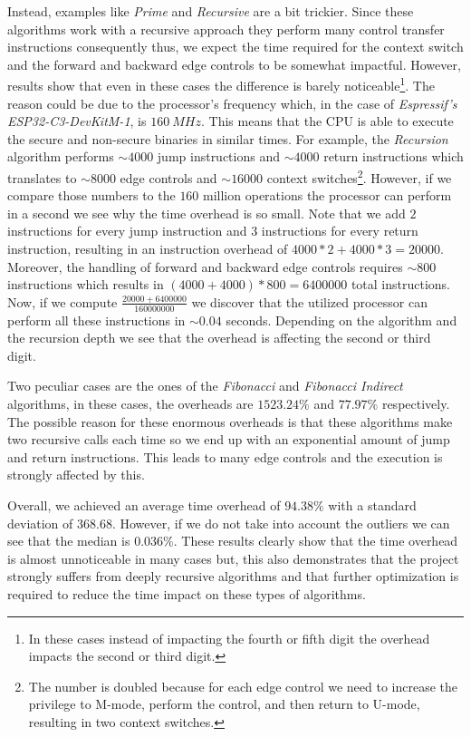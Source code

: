 Instead, examples like \textit{Prime} and \textit{Recursive} are a bit trickier.
Since these algorithms work with a recursive approach they perform many control
transfer instructions consequently thus, we expect the time required for the context
switch and the forward and backward edge controls to be somewhat impactful.
However, results show that even in these cases the difference is barely noticeable\footnote{In
these cases instead of impacting the fourth or fifth digit the overhead impacts
the second or third digit.}. The reason could be due to the processor's frequency
which, in the case of \textit{Espressif's ESP32-C3-DevKitM-1}, is $160 \ MHz$. This
means that the CPU is able to execute the secure and non-secure binaries in similar
times. For example, the \textit{Recursion} algorithm performs $\sim 4000$ jump
instructions and $\sim 4000$ return instructions which translates to $\sim 8000$
edge controls and $\sim 16000$ context switches\footnote{The number is doubled
because for each edge control we need to increase the privilege to M-mode, perform
the control, and then return to U-mode, resulting in two context switches.}.
However, if we compare those numbers to the $160$ million operations the processor
can perform in a second we see why the time overhead is so small. Note that we
add $2$ instructions for every jump instruction and $3$ instructions for every
return instruction, resulting in an instruction overhead of $4000*2 + 4000*3 = 20
000$. Moreover, the handling of forward and backward edge controls requires $\sim
800$ instructions which results in $(4000 + 4000) * 800 = 6400000$ total instructions.
Now, if we compute $\frac{20000 + 6400000}{160000000}$ we discover that the utilized
processor can perform all these instructions in $\sim 0.04$ seconds. Depending
on the algorithm and the recursion depth we see that the overhead is affecting
the second or third digit.

Two peculiar cases are the ones of the \textit{Fibonacci} and \textit{Fibonacci
Indirect} algorithms, in these cases, the overheads are $1523.24\%$ and
$77.97\%$ respectively. The possible reason for these enormous overheads is that
these algorithms make two recursive calls each time so we end up with an exponential
amount of jump and return instructions. This leads to many edge controls and the
execution is strongly affected by this.

Overall, we achieved an average time overhead of $94.38\%$ with a standard deviation
of $368.68$. However, if we do not take into account the outliers we can see that
the median is $0.036\%$. These results clearly show that the time overhead is
almost unnoticeable in many cases but, this also demonstrates that the project strongly
suffers from deeply recursive algorithms and that further optimization is required
to reduce the time impact on these types of algorithms.

